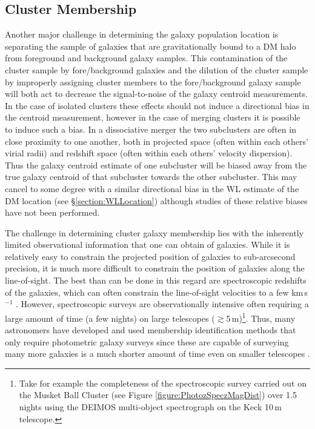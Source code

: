 \subsection{Cluster Membership}

Another major challenge in determining the galaxy population location is separating the sample of galaxies that are gravitationally bound to a DM halo from foreground and background galaxy samples.
This contamination of the cluster sample by fore/background galaxies and the dilution of the cluster sample by improperly assigning cluster members to the fore/background galaxy sample will both act to decrease the signal-to-noise of the galaxy centroid measurements.
In the case of isolated clusters these effects should not induce a directional bias in the centroid measurement, however in the case of merging clusters it is possible to induce such a bias.
In a dissociative merger the two subclusters are often in close proximity to one another, both in projected space (often within each others' virial radii) and redshift space (often within each others' velocity dispersion).
Thus the galaxy centroid estimate of one subcluster will be biased away from the true galaxy centroid of that subcluster towards the other subcluster.
This may cancel to some degree with a similar directional bias in the WL estimate of the DM location (see \S\ref{section:WLLocation}) although studies of these relative biases have not been performed.  

The challenge in determining cluster galaxy membership lies with the inherently limited observational information that one can obtain of galaxies.
While it is relatively easy to constrain the projected position of galaxies to sub-arcsecond precision, it is much more difficult to constrain the position of galaxies along the line-of-sight.
The best than can be done in this regard are spectroscopic redshifts of the galaxies, which can often constrain the line-of-sight velocities to a few km\,s$^{-1}$ \citep[in the case of a 1200 line mm$^{-1}$ grating with resulting resolution of $\sim 1\,\AA$; see e.g.][]{Dawson:2012ub}.
However, spectroscopic surveys are observationally intensive often requiring a large amount of time (a few nights) on large telescopes ($\gtrsim$5\,m)\footnote{Take for example the completeness of the spectroscopic survey carried out on the Musket Ball Cluster (see Figure \ref{figure:PhotozSpeczMagDist}) over 1.5 nights using the DEIMOS multi-object spectrograph on the Keck 10\,m telescope.}.
Thus, many astronomers have developed and used membership identification methods that only require photometric galaxy surveys since these are capable of surveying many more galaxies is a much shorter amount of time even on smaller telescopes \citep[e.g. the DLS,][]{Wittman:2002cp}. 

